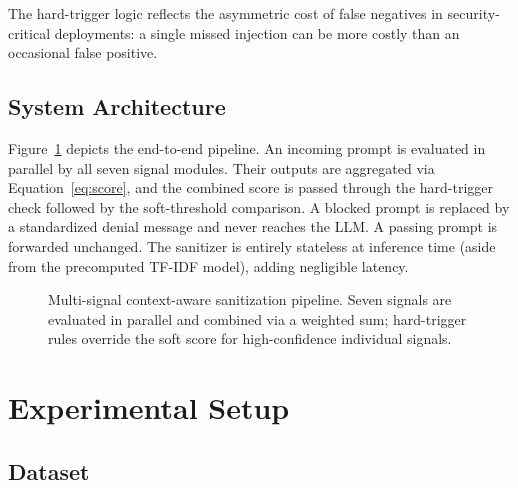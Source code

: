 \documentclass[10pt,conference]{IEEEtran}
\begin{document}
The hard-trigger logic reflects the asymmetric cost of false negatives
in security-critical deployments: a single missed injection can be
more costly than an occasional false positive.

\subsection{System Architecture}

Figure~\ref{fig:arch} depicts the end-to-end pipeline.
An incoming prompt is evaluated in parallel by all seven signal
modules.
Their outputs are aggregated via Equation~\ref{eq:score}, and the
combined score is passed through the hard-trigger check followed by
the soft-threshold comparison.
A blocked prompt is replaced by a standardized denial message and
never reaches the LLM.
A passing prompt is forwarded unchanged.
The sanitizer is entirely stateless at inference time (aside from the
precomputed TF-IDF model), adding negligible latency.

\begin{figure}[t]
  \centering
  \caption{Multi-signal context-aware sanitization pipeline.
           Seven signals are evaluated in parallel and combined via
           a weighted sum; hard-trigger rules override the soft score
           for high-confidence individual signals.}
  \label{fig:arch}
\end{figure}

\section{Experimental Setup}
\label{sec:setup}

\subsection{Dataset}
\end{document}
